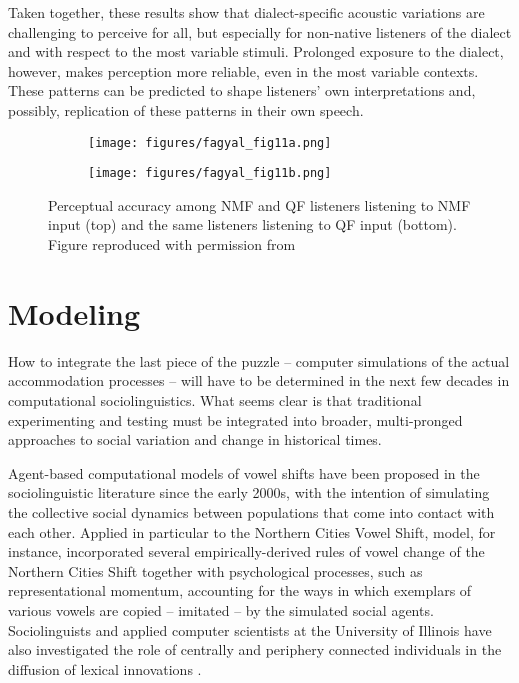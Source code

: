 \documentclass[output=paper,colorlinks,citecolor=brown]{langscibook}
\begin{document}
Taken together, these results show that dialect-specific acoustic variations are challenging to perceive for all, but especially for non-native listeners of the dialect and with respect to the most variable stimuli. Prolonged exposure to the dialect, however, makes perception more reliable, even in the most variable contexts. These patterns can be predicted to shape listeners’ own interpretations and, possibly, replication of these patterns in their own speech.
\begin{figure}
  \begin{subfigure}{\textwidth}
    \texttt{[image: figures/fagyal\_fig11a.png]}
    \caption{}
    \label{fig:11a}
    \end{subfigure}
    \begin{subfigure}{\textwidth}
    \texttt{[image: figures/fagyal\_fig11b.png]}
    \caption{}
    \label{fig:11b}
    \end{subfigure}
    \caption{Perceptual accuracy among NMF and QF listeners listening to NMF input (top) and the same listeners listening to QF input (bottom). Figure reproduced with permission from \citet{nicholas_role_review}}
    \label{fig:11}
\end{figure}



\section{Modeling}

How to integrate the last piece of the puzzle -- computer simulations of the actual accommodation processes -- will have to be determined in the next few decades in computational sociolinguistics. What seems clear is that traditional experimenting and testing must be integrated into broader, multi-pronged approaches to social variation and change in historical times.

Agent-based computational models of vowel shifts have been proposed in the sociolinguistic literature since the early 2000s, with the intention of simulating the collective social dynamics between populations that come into contact with each other. Applied in particular to the Northern Cities Vowel Shift,  model, for instance, incorporated several empirically-derived rules of vowel change of the Northern Cities Shift together with psychological processes, such as representational momentum, accounting for the ways in which exemplars of various vowels are copied -- imitated -- by the simulated social agents. Sociolinguists and applied computer scientists at the University of Illinois have also investigated the role of centrally and periphery connected individuals in the diffusion of lexical innovations \citep{Fagyal2010}.
\end{document}
